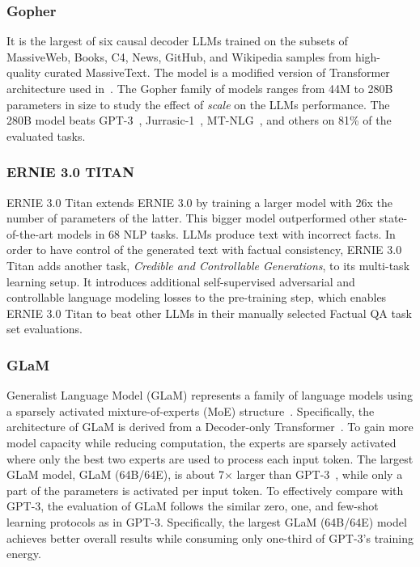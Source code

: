 \subsubsection{Gopher~\cite{gopher}}
It is the largest of six causal decoder LLMs trained on the subsets of MassiveWeb, Books, C4, News, GitHub, and Wikipedia samples from high-quality curated MassiveText. The model is a modified version of Transformer architecture used in~\cite{GPT-2}. The Gopher family of models ranges from 44M to 280B parameters in size to study the effect of \textit{scale} on the LLMs performance. The 280B model beats GPT-3~\cite{GPT-3}, Jurrasic-1~\cite{lieber2021jurassic}, MT-NLG~\cite{mtnlg}, and others on 81\% of the evaluated tasks.

\subsubsection{ERNIE 3.0 TITAN~\cite{ernie3titan}}
ERNIE 3.0 Titan extends ERNIE 3.0 by training a larger model with 26x the number of parameters of the latter. This bigger model outperformed other state-of-the-art models in 68 NLP tasks. LLMs produce text with incorrect facts. In order to have control of the generated text with factual consistency, ERNIE 3.0 Titan adds another task, \textit{Credible and Controllable Generations}, to its multi-task learning setup. It introduces additional self-supervised adversarial and controllable language modeling losses to the pre-training step, which enables ERNIE 3.0 Titan to beat other LLMs in their manually selected Factual QA task set evaluations.

\subsubsection{GLaM~\cite{du2022glam}}
Generalist Language Model (GLaM) represents a family of language models using a sparsely activated mixture-of-experts (MoE) structure~\cite{shazeer2017outrageously,fedus2022switch}. Specifically, the architecture of GLaM is derived from a Decoder-only Transformer~\cite{Transformers}. To gain more model capacity while reducing computation, the experts are sparsely activated where only the best two experts are used to process each input token. The largest GLaM model, GLaM (64B/64E), is about 7$\times$ larger than GPT-3~\cite{GPT-3}, while only a part of the parameters is activated per input token. To effectively compare with GPT-3, the evaluation of GLaM follows the similar zero, one, and few-shot learning protocols as in GPT-3. Specifically, the largest GLaM (64B/64E) model achieves better overall results while consuming only one-third of GPT-3's training energy.

